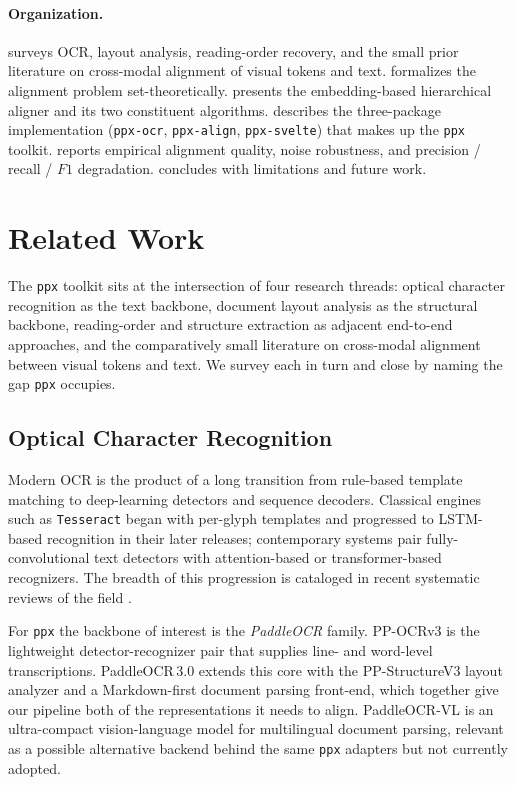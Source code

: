 \documentclass{article}
\theoremstyle{definition}
\begin{document}
\paragraph{Organization.}
 surveys OCR, layout analysis, reading-order
recovery, and the small prior literature on cross-modal alignment of
visual tokens and text.   formalizes the alignment
problem set-theoretically.   presents the
embedding-based hierarchical aligner and its two constituent
algorithms.   describes the three-package
implementation (\texttt{ppx-ocr}, \texttt{ppx-align},
\texttt{ppx-svelte}) that makes up the \texttt{ppx} toolkit.
 reports empirical alignment quality, noise
robustness, and precision / recall / $F1$ degradation.
 concludes with limitations and future work.

\section{Related Work}
\label{sec:related}

The \texttt{ppx} toolkit sits at the intersection of four research
threads: optical character recognition as the text backbone, document
layout analysis as the structural backbone, reading-order and
structure extraction as adjacent end-to-end approaches, and the
comparatively small literature on cross-modal alignment between
visual tokens and text.  We survey each in turn and close by naming
the gap \texttt{ppx} occupies.

\subsection{Optical Character Recognition}

Modern OCR is the product of a long transition from rule-based
template matching to deep-learning detectors and sequence decoders.
Classical engines such as \texttt{Tesseract} \cite{smith2007tesseract}
began with per-glyph templates and progressed to LSTM-based
recognition in their later releases; contemporary systems pair
fully-convolutional text detectors with attention-based or
transformer-based recognizers.  The breadth of this progression is
cataloged in recent systematic reviews of the field
\cite{ieee2025systematic}.

For \texttt{ppx} the backbone of interest is the \emph{PaddleOCR}
family.  PP-OCRv3 \cite{PaddleOCRv3} is the lightweight
detector-recognizer pair that supplies line- and word-level
transcriptions.  PaddleOCR\,3.0 \cite{PaddleOCR30} extends this core
with the PP-StructureV3 layout analyzer and a Markdown-first
document parsing front-end, which together give our pipeline both of
the representations it needs to align.  PaddleOCR-VL
\cite{paddleocrvl2025} is an ultra-compact vision-language model
for multilingual document parsing, relevant as a possible alternative
backend behind the same \texttt{ppx} adapters but not currently
adopted.
\end{document}
